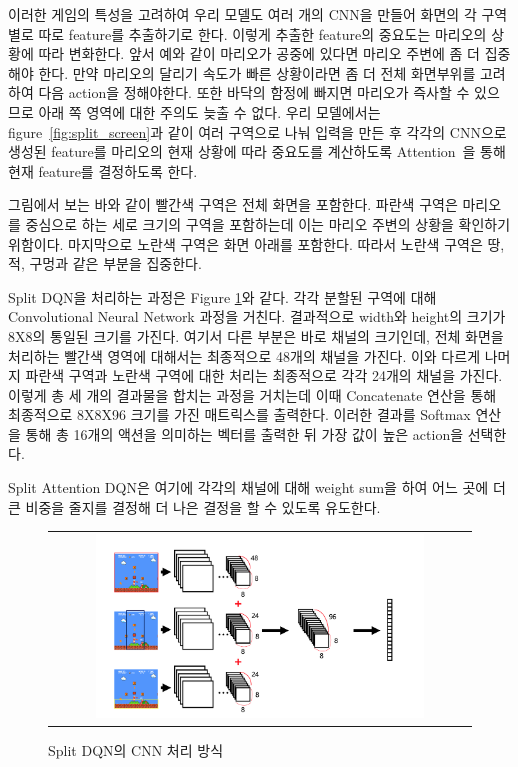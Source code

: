 이러한 게임의 특성을 고려하여 우리 모델도 여러 개의 CNN을 만들어 화면의 각 구역별로 따로 feature를 추출하기로 한다.
이렇게 추출한 feature의 중요도는 마리오의 상황에 따라 변화한다. 앞서 예와 같이 마리오가 공중에 있다면 마리오 주변에 좀 더 집중해야 한다.
만약 마리오의 달리기 속도가 빠른 상황이라면 좀 더 전체 화면부위를 고려하여 다음 action을 정해야한다.
또한 바닥의 함정에 빠지면 마리오가 즉사할 수 있으므로 아래 쪽 영역에 대한 주의도 늦출 수 없다.
우리 모델에서는 figure~\ref{fig:split_screen}과 같이 여러 구역으로 나눠 입력을 만든 후 각각의 CNN으로 생성된 feature를 마리오의 현재 상황에 따라 중요도를 계산하도록 Attention~\cite{Attention}을 통해 현재 feature를 결정하도록 한다.

그림에서 보는 바와 같이 빨간색 구역은 전체 화면을 포함한다. 
파란색 구역은 마리오를 중심으로 하는 세로 크기의 구역을 포함하는데 이는 마리오 주변의 상황을 확인하기 위함이다.
마지막으로 노란색 구역은 화면 아래를 포함한다. 
따라서 노란색 구역은 땅, 적, 구멍과 같은 부분을 집중한다. 

Split DQN을 처리하는 과정은 Figure \ref{fig:split_dqn}와 같다. 
각각 분할된 구역에 대해 Convolutional Neural Network 과정을 거친다. 
결과적으로 width와 height의 크기가 8X8의 통일된 크기를 가진다. 
여기서 다른 부분은 바로 채널의 크기인데, 전체 화면을 처리하는 빨간색 영역에 대해서는 최종적으로 48개의 채널을 가진다.
이와 다르게 나머지 파란색 구역과 노란색 구역에 대한 처리는 최종적으로 각각 24개의 채널을 가진다. 
이렇게 총 세 개의 결과물을 합치는 과정을 거치는데 이때 Concatenate 연산을 통해 최종적으로 8X8X96 크기를 가진 매트릭스를 출력한다. 
이러한 결과를 Softmax 연산을 통해 총 16개의 액션을 의미하는 벡터를 출력한 뒤 가장 값이 높은 action을 선택한다. 

Split Attention DQN은 여기에 각각의 채널에 대해 weight sum을 하여 어느 곳에 더 큰 비중을 줄지를 결정해 더 나은 결정을 할 수 있도록 유도한다. 


\begin{figure}[]
\begin{center}
\begin{tabular}{c}
     \includegraphics[width=0.8\textwidth]{FIG/split_dqn.png} \\
\end{tabular}
\caption{
	Split DQN의 CNN 처리 방식
}
\label{fig:split_dqn}
\end{center}
\end{figure}

